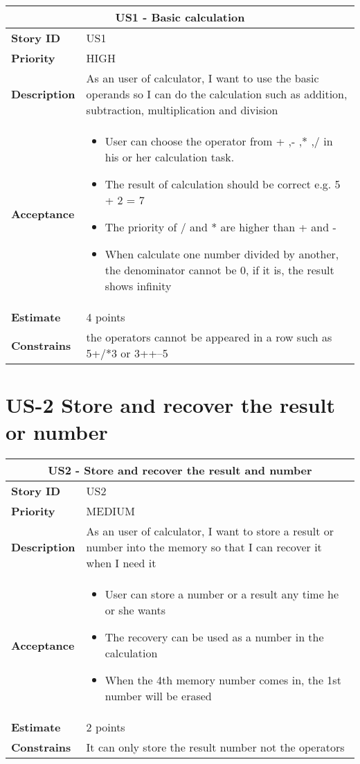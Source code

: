 \documentclass[12pt]{report}
\begin{document}
{\begin{tabular}{ |p{4cm}|p{10cm}| }
 \hline
 \multicolumn{2}{|c|}{US1 - Basic calculation} \\
 \hline
 \textbf {Story ID}& US1 \\
 \hline
   \textbf{Priority} & HIGH \\
 \hline
  \textbf{Description}   & As an user of calculator, I want to use the basic operands so I can do the calculation such as addition, subtraction, multiplication and division  \\
\hline
     \textbf{Acceptance}& 
     \begin{itemize}
     \item User can choose the operator from + ,- ,* ,/ in his or her calculation task.
     \item The result of calculation should be correct e.g. 5 + 2 = 7
     \item The priority of / and * are higher than + and -
     \item When calculate one number divided by another, the denominator cannot be 0, if it is, the result shows infinity 
     \end{itemize}
     \\
\hline
 \textbf{Estimate} & 4 points \\
 \hline
\textbf{Constrains}& the operators cannot be appeared in a row such as 5+/*3 or 3++--5 \\
 \hline
\end{tabular}


\section{US-2 Store and recover the result or number}
\begin{tabular}{ |p{4cm}|p{10cm}| }
 \hline
 \multicolumn{2}{|c|}{US2 - Store and recover the result and number } \\
 \hline
 \textbf {Story ID}& US2 \\
 \hline
 \textbf{Priority} & MEDIUM \\
 \hline
  \textbf{Description}   & As an user of calculator, I want to  store a result or number into the memory so that I can recover it when I need it \\
 \hline
\textbf{Acceptance}&
   \begin{itemize}
     \item User can store a number or a result any time he or she wants
     \item The recovery can be used as a number in the calculation
     \item When the 4th memory number comes in, the 1st number will be erased 
     \end{itemize}
\\
 \hline
 \textbf{Estimate} & 2 points\\
 \hline
 \textbf{Constrains}& It can only store the result number not the operators  \\
 \hline
\end{tabular}


}
\end{document}
